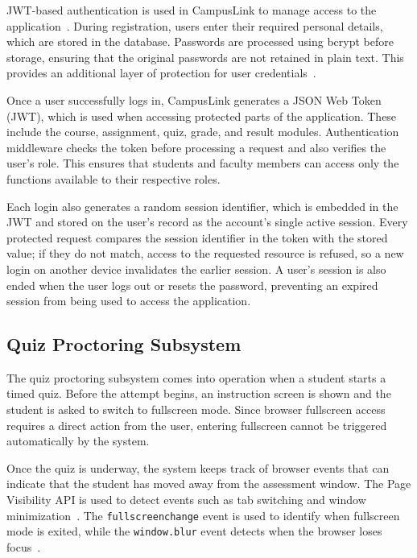 \documentclass[conference]{IEEEtran}
\begin{document}
JWT-based authentication is used in CampusLink to manage access to the application~\cite{jwt}. During registration, users enter their required personal details, which are stored in the database. Passwords are processed using bcrypt before storage, ensuring that the original passwords are not retained in plain text. This provides an additional layer of protection for user credentials~\cite{owaspPassword}.

Once a user successfully logs in, CampusLink generates a JSON Web Token (JWT), which is used when accessing protected parts of the application. These include the course, assignment, quiz, grade, and result modules. Authentication middleware checks the token before processing a request and also verifies the user's role. This ensures that students and faculty members can access only the functions available to their respective roles.

Each login also generates a random session identifier, which is embedded in the JWT and stored on the user's record as the account's single active session. Every protected request compares the session identifier in the token with the stored value; if they do not match, access to the requested resource is refused, so a new login on another device invalidates the earlier session. A user's session is also ended when the user logs out or resets the password, preventing an expired session from being used to access the application.

\subsection{Quiz Proctoring Subsystem}

The quiz proctoring subsystem comes into operation when a student starts a timed quiz. Before the attempt begins, an instruction screen is shown and the student is asked to switch to fullscreen mode. Since browser fullscreen access requires a direct action from the user, entering fullscreen cannot be triggered automatically by the system.

Once the quiz is underway, the system keeps track of browser events that can indicate that the student has moved away from the assessment window. The Page Visibility API is used to detect events such as tab switching and window minimization~\cite{visibilityapi}. The \texttt{fullscreenchange} event is used to identify when fullscreen mode is exited, while the \texttt{window.blur} event detects when the browser loses focus~\cite{fullscreenapi}.
\end{document}
